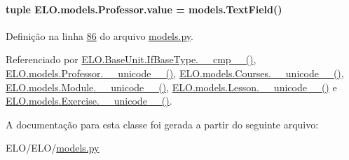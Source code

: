 \hypertarget{classELO_1_1models_1_1Professor_abfa283169333876d02cf63886ca872e6}{
\paragraph[{value}]{\setlength{\rightskip}{0pt plus 5cm}tuple E\-L\-O.\-models.\-Professor.\-value = models.\-Text\-Field()\hspace{0.3cm}{\ttfamily [static]}}}\label{classELO_1_1models_1_1Professor_abfa283169333876d02cf63886ca872e6}


Definição na linha \hyperlink{ELO_2models_8py_source_l00086}{86} do arquivo \hyperlink{ELO_2models_8py_source}{models.\-py}.



Referenciado por \hyperlink{classELO_1_1BaseUnit_1_1IfBaseType_a69c338f6f1574bd3524e9d59ebc17a7c}{E\-L\-O.\-Base\-Unit.\-If\-Base\-Type.\-\_\-\-\_\-cmp\-\_\-\-\_\-()}, \hyperlink{classELO_1_1models_1_1Professor_aefc9d63d429e19ec3487a7879879f29d}{E\-L\-O.\-models.\-Professor.\-\_\-\-\_\-unicode\-\_\-\-\_\-()}, \hyperlink{classELO_1_1models_1_1Courses_a8926a37152be8d4fc3e0ba6af200f871}{E\-L\-O.\-models.\-Courses.\-\_\-\-\_\-unicode\-\_\-\-\_\-()}, \hyperlink{classELO_1_1models_1_1Module_a1b54aa7a5e8dac090dea0926eca5550d}{E\-L\-O.\-models.\-Module.\-\_\-\-\_\-unicode\-\_\-\-\_\-()}, \hyperlink{classELO_1_1models_1_1Lesson_a3d9f0295dbe1ed5c74668d6c0876f97c}{E\-L\-O.\-models.\-Lesson.\-\_\-\-\_\-unicode\-\_\-\-\_\-()} e \hyperlink{classELO_1_1models_1_1Exercise_af3e991e5610cec815a2c3260ec6aae0b}{E\-L\-O.\-models.\-Exercise.\-\_\-\-\_\-unicode\-\_\-\-\_\-()}.



A documentação para esta classe foi gerada a partir do seguinte arquivo\-:\begin{DoxyCompactItemize}
\item 
E\-L\-O/\-E\-L\-O/\hyperlink{ELO_2models_8py}{models.\-py}\end{DoxyCompactItemize}
